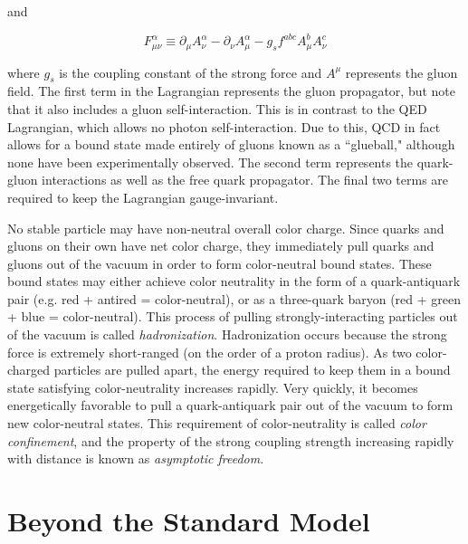 and

\begin{equation}
F^{\alpha}_{\mu\nu} \equiv \partial_{\mu}A^{\alpha}_{\nu} - \partial_{\nu}A^{\alpha}_{\mu} - g_{s}f^{abc}A^{b}_{\mu}A^{c}_{\nu}
\end{equation}

where $g_{s}$ is the coupling constant of the strong force and $A^{\mu}$ represents the gluon field. The first term in the Lagrangian represents the gluon propagator, but note that it also includes a gluon self-interaction. This is in contrast to the QED Lagrangian, which allows no photon self-interaction. Due to this, QCD in fact allows for a bound state made entirely of gluons known as a ``glueball," although none have been experimentally observed. The second term represents the quark-gluon interactions as well as the free quark propagator. The final two terms are required to keep the Lagrangian gauge-invariant.

No stable particle may have non-neutral overall color charge. Since quarks and gluons on their own have net color charge, they immediately pull quarks and gluons out of the vacuum in order to form color-neutral bound states. These bound states may either achieve color neutrality in the form of a quark-antiquark pair (e.g. red + antired = color-neutral), or as a three-quark baryon (red + green + blue = color-neutral). This process of pulling strongly-interacting particles out of the vacuum is called \textit{hadronization}. Hadronization occurs because the strong force is extremely short-ranged (on the order of a proton radius). As two color-charged particles are pulled apart, the energy required to keep them in a bound state satisfying color-neutrality increases rapidly. Very quickly, it becomes energetically favorable to pull a quark-antiquark pair out of the vacuum to form new color-neutral states. This requirement of color-neutrality is called \textit{color confinement}, and the property of the strong coupling strength increasing rapidly with distance is known as \textit{asymptotic freedom}.



\chapter{Beyond the Standard Model}


